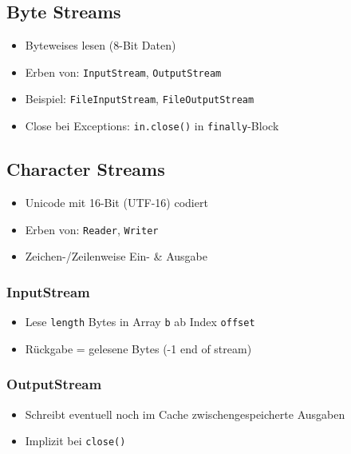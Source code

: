 \begin{minipage}[t]{0.5\columnwidth}
    \subsection{Byte Streams}
    \raggedright%
    \begin{itemize}
        \item Byteweises lesen (8-Bit Daten)
        \item Erben von: \lstinline{InputStream}, \lstinline{OutputStream}
        \item Beispiel: \lstinline{FileInputStream}, \lstinline{FileOutputStream}
        \item Close bei Exceptions: \lstinline{in.close()} in \lstinline{finally}-Block
    \end{itemize}
\end{minipage}\hfill%
\begin{minipage}[t]{0.49\columnwidth}
    \subsection{Character Streams}
    \raggedright%
    \begin{itemize}
        \item Unicode mit 16-Bit (UTF-16) codiert
        \item Erben von: \lstinline{Reader}, \lstinline{Writer}
        \item Zeichen-/Zeilenweise Ein- \& Ausgabe
    \end{itemize}
\end{minipage}


\subsubsection{\textsf{InputStream}}

\begin{itemize}
    \item Lese \lstinline{length} Bytes in Array \lstinline{b} ab Index \lstinline{offset}
    \item Rückgabe = gelesene Bytes (-1 \textlrarrow{} end of stream)
\end{itemize}

\subsubsection{\textsf{OutputStream}}

\begin{itemize}
    \item Schreibt eventuell noch im Cache zwischengespeicherte Ausgaben
    \item Implizit bei \lstinline{close()}
\end{itemize}

